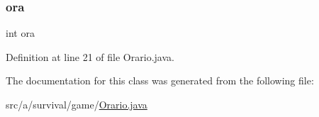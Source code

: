\mbox{\label{classa_1_1survival_1_1game_1_1_orario_aa2b74e08727f05e180669d8822966c0b}} 
\subsubsection{\texorpdfstring{ora}{ora}}
{\footnotesize\ttfamily int ora}



Definition at line 21 of file Orario.\+java.



The documentation for this class was generated from the following file\+:\begin{DoxyCompactItemize}
\item 
src/a/survival/game/\hyperlink{_orario_8java}{Orario.\+java}\end{DoxyCompactItemize}
